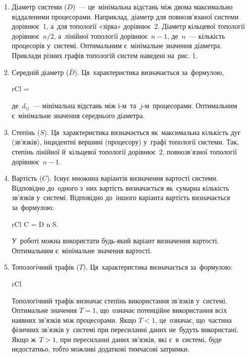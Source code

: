 \documentclass[
	a4paper,
	oneside,
	BCOR = 10mm,
	DIV = 12,
	12pt,
	headings = normal,
]{scrartcl}
\begin{document}
		\begin{enumerate}
			\item Діаметр системи ($D$)~— це~мінімальна відстань між двома максимально віддаленими процесорами. Наприклад, діаметр для повнозв’язаної системи дорівнює~1, а~для топології «зірка» дорівнює~2. Діаметр кільцевої топології дорівнює~$n/2$, а~лінійної топології дорівнює~$n - 1$, де~$n$~— кількість процесорів у~системі. Оптимальним є~мінімальне значення діаметра. Приклади різних графів топологій систем наведені на~рис. 1.
			\item Середній діаметр ($\overline{D}$). Ця~характеристика визначається за~формулою,
				\begin{IEEEeqnarray}{rCl}
					 = 
				\end{IEEEeqnarray}
				де~$d_{ij}$~— мінімальна відстань між $і$-м~та~$j$-м~процесорами. Оптимальним є~мінімальне значення середнього діаметра.
			\item Степінь ($S$). Ця~характеристика визначається як~максимальна кількість дуг (зв'язків), інцидентні вершині (процесору) у~графі топології системи. Так, степінь лінійної й~кільцевої топології дорівнює~2, повнозв’язної топології дорівнює~$n - 1$.
			\item Вартість ($C$). Існує множина варіантів визначення вартості системи. Відповідно до~одного з~них вартість визначається як~сумарна кількість зв'язків у~системі. Відповідно до~іншого варіанта вартість визначається за~формулою:
				\begin{IEEEeqnarray}{rCl}
					C = D n S.
				\end{IEEEeqnarray}
				У~роботі можна використати будь-який варіант визначення вартості. Оптимальним є~мінімальне значення вартості.
			\item Топологічний трафік ($T$).	Ця~характеристика визначається за~формулою:
				\begin{IEEEeqnarray}{rCl}
				\end{IEEEeqnarray}
				Топологічний трафік визначає степінь використання зв'язків у~системі. Оптимальне значення $T = 1$, що~означає потенційне використання всіх наявних зв'язків між процесорами. Якщо $T < 1$, це~означає, що~частина фізичних зв'язків у~системі при пересиланні даних не~будуть використані. Якщо ж~$T > 1$, при пересиланні даних зв'язків, які є~в~системі, буде недостатньо, тобто можливі додаткові тимчасові затримки.
		\end{enumerate}
\end{document}
